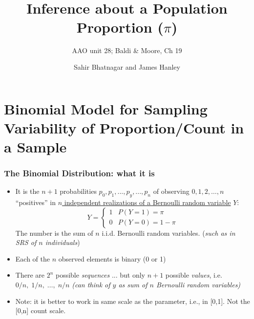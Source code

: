 \documentclass{beamer}\usepackage[]{graphicx}\usepackage[]{color}
\begin{document}




\title{Inference about a Population Proportion ($\pi$)}
\subtitle{AAO unit 28; Baldi \& Moore, Ch 19}
\author{Sahir Bhatnagar and James Hanley}


\maketitle

\section{Binomial Model for Sampling Variability of Proportion/Count in a Sample}




\begin{frame}
\frametitle{The Binomial Distribution: what it is}
\small
\begin{itemize}
	\setlength\itemsep{0.5em}
	\item It is the $n+1$ probabilities $p_{0}, p_{1}, ..., p_{y}, ..., p_{n}$ of observing 
	$0, 1, 2, \dots , n$ ``positives''  in \underline{$n$ independent realizations of a Bernoulli random variable} $Y$:
	$$
	Y = \begin{cases}
	1 & P(Y=1) = \pi \\
	0 & P(Y=0) = 1-\pi
	\end{cases}	
	$$
	The number is the sum of $n$ i.i.d. Bernoulli random variables.
	(\emph{such as in SRS of $n$ individuals}) \pause 
	\item Each of the $n$ observed elements is binary (0 or 1) \pause 
	\item There are $2^{n}$ possible \textit{sequences} ... but only $n+1$ possible \textit{values}, 
	i.e. $0/n,\;1/n,\;\dots ,\;n/n$  \emph{(can think of $y$ as sum of $n$ Bernoulli random variables)} 
	\item Note: it is better to work in same scale as the parameter, i.e., in [0,1]. Not the [0,n] count scale.
\end{itemize}
\end{frame}	
	
\end{document}
